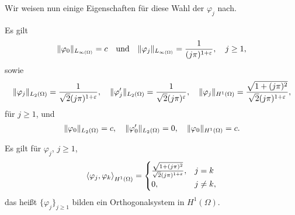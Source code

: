 Wir weisen nun einige Eigenschaften für diese Wahl der $\varphi_{j}$ nach.

\begin{Lemma}[Normen]
    Es gilt
    \begin{equation}
        \lVert\varphi_{0}\rVert_{L_{\infty(\Omega)}} = c \quad \text{und} \quad \lVert\varphi_{j}\rVert_{L_{\infty(\Omega)}} = \frac{1}{(j \pi)^{1 + \varepsilon}}, \quad j \geq 1,
    \end{equation}
    sowie
    \begin{equation}
        \begin{aligned}
            \lVert\varphi_{j}\rVert_{L_{2}(\Omega)}  = \frac{1}{\sqrt{2}(j \pi)^{1+ \varepsilon}}, \quad
            \lVert\varphi'_{j}\rVert_{L_{2}(\Omega)} = \frac{1}{\sqrt{2}(j \pi)^{\varepsilon}}, \quad
            \lVert\varphi_{j}\rVert_{H^{1}(\Omega)}  = \frac{\sqrt{1 + (j \pi)^{2}}}{\sqrt 2 (j \pi)^{1 + \varepsilon}},
        \end{aligned}
    \end{equation}
    für $j \geq 1$, und
    \begin{equation}
        \begin{aligned}
            \lVert\varphi_{0}\rVert_{L_{2}(\Omega)}  = c, \quad
            \lVert\varphi'_{0}\rVert_{L_{2}(\Omega)} = 0, \quad
            \lVert\varphi_{0}\rVert_{H^{1}(\Omega)}  = c.
        \end{aligned}
    \end{equation}
\end{Lemma}

\begin{Lemma}[Orthogonalität]
    Es gilt für $\varphi_{j}$, $j \geq 1$,
    \begin{equation}
        \left\langle\varphi_{j},\varphi_{k}\right\rangle_{H^{1}(\Omega)} = \begin{cases}
            \frac{\sqrt{1 + (j \pi)^{2}}}{\sqrt 2 (j \pi)^{1 + \varepsilon}},   &j = k \\
            0,          &j \neq k,
        \end{cases}
    \end{equation}
    das heißt $\{ \varphi_{j} \}_{j \geq 1}$ bilden ein Orthogonalsystem in $H^{1}(\Omega)$.
\end{Lemma}

